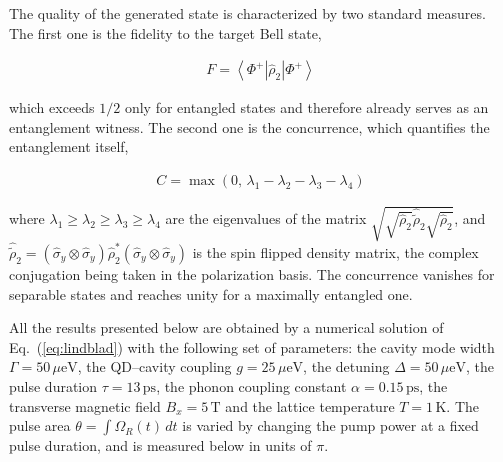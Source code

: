 \documentclass[prb,twocolumn,preprintnumbers,superscriptaddress]{revtex4-2}
\begin{document}
The quality of the generated state is characterized by two standard measures.
The first one is the fidelity to the target Bell state,

\begin{gather}
    F = \left< \Phi^+ \right| \hat{\rho}_2 \left| \Phi^+ \right>
    \label{eq:fidelity}
\end{gather}

which exceeds $1/2$ only for entangled states and therefore already serves as an
entanglement witness.
The second one is the concurrence, which quantifies the entanglement itself,

\begin{gather}
    C = \max \left( 0 , \, \lambda_1 - \lambda_2 - \lambda_3 - \lambda_4 \right)
    \label{eq:concurrence}
\end{gather}

where $\lambda_1 \geq \lambda_2 \geq \lambda_3 \geq \lambda_4$ are
the eigenvalues of the matrix $\sqrt{\sqrt{\hat{\rho}_2} \hat{\tilde{\rho}}_2 \sqrt{\hat{\rho}_2} }$, and
$\hat{\tilde{\rho}}_2 = \left( \hat{\sigma}_y \otimes \hat{\sigma}_y \right)
\hat{\rho}_2^{*} \left( \hat{\sigma}_y \otimes \hat{\sigma}_y \right)$ is the spin
flipped density matrix, the complex conjugation being taken in the polarization
basis.
The concurrence vanishes for separable states and reaches unity for a maximally
entangled one.

All the results presented below are obtained by a numerical solution of
Eq.~(\ref{eq:lindblad}) with the following set of parameters:
the cavity mode width $\Gamma = 50\,\mu\text{eV}$, the QD--cavity coupling
$g = 25\,\mu\text{eV}$, the detuning $\Delta = 50\,\mu\text{eV}$, the pulse duration
$\tau = 13\,\text{ps}$, the phonon coupling constant $\alpha = 0.15\,\text{ps}$, the
transverse magnetic field $B_x = 5\,\text{T}$ and the lattice temperature
$T = 1\,\text{K}$.
The pulse area $\theta = \int \Omega_R(t) \, dt$ is varied by changing the pump
power at a fixed pulse duration, and is measured below in units of $\pi$.
\end{document}
